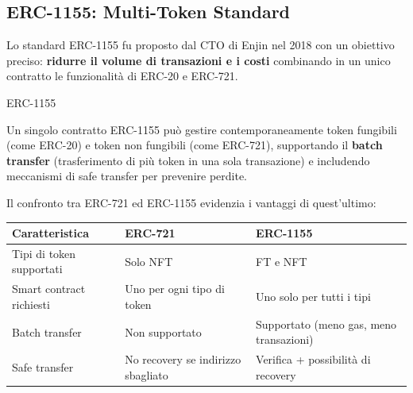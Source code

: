 \documentclass[
  italian,
  openany]{book}
\newcounter{none} %
\begin{document}
\subsection{ERC-1155: Multi-Token
Standard}\label{erc-1155-multi-token-standard}

Lo standard ERC-1155 fu proposto dal CTO di Enjin nel 2018 con un
obiettivo preciso: \textbf{ridurre il volume di transazioni e i costi}
combinando in un unico contratto le funzionalità di ERC-20 e ERC-721.

\begin{calloutdefinition}{ERC-1155}

Un singolo contratto ERC-1155 può gestire contemporaneamente token
fungibili (come ERC-20) e token non fungibili (come ERC-721),
supportando il \textbf{batch transfer} (trasferimento di più token in
una sola transazione) e includendo meccanismi di safe transfer per
prevenire perdite.

\end{calloutdefinition}

Il confronto tra ERC-721 ed ERC-1155 evidenzia i vantaggi di
quest'ultimo:

{\def\LTcaptype{none} %
\begin{longtable}[]{@{}
  >{\raggedright\arraybackslash}p{}
  >{\raggedright\arraybackslash}p{}
  >{\raggedright\arraybackslash}p{}@{}}
\toprule\noalign{}
\begin{minipage}[b]{\linewidth}\raggedright
Caratteristica
\end{minipage} & \begin{minipage}[b]{\linewidth}\raggedright
ERC-721
\end{minipage} & \begin{minipage}[b]{\linewidth}\raggedright
ERC-1155
\end{minipage} \\
\midrule\noalign{}
\endhead
\bottomrule\noalign{}
\endlastfoot
Tipi di token supportati & Solo NFT & FT e NFT \\
Smart contract richiesti & Uno per ogni tipo di token & Uno solo per
tutti i tipi \\
Batch transfer & Non supportato & Supportato (meno gas, meno
transazioni) \\
Safe transfer & No recovery se indirizzo sbagliato & Verifica +
possibilità di recovery \\
\end{longtable}
}
\end{document}
